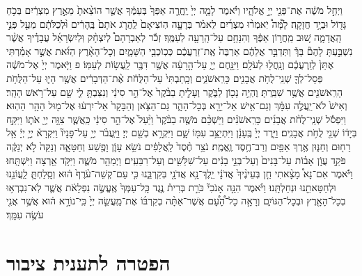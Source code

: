 \documentclass[twoside, openany, parskip=half, 11pt]{book}
\begin{document}
\begin{footnotesize}
\begin{multicols}{2}
וַיְחַ֣ל מֹשֶׁ֔ה אֶת־פְּנֵ֖י יְיָ֣ אֱלֹהָ֑יו וַיֹּ֗אמֶר לָמָ֤ה יְיָ֙ יֶֽחֱרֶ֤ה אַפְּךָ֙ בְּעַמֶּ֔ךָ אֲשֶׁ֤ר הוֹצֵ֨אתָ֙ מֵאֶ֣רֶץ מִצְרַ֔יִם בְּכֹ֥חַ גָּד֖וֹל וּבְיָ֥ד חֲזָקָֽה׃ לָ֩מָּה֩ יֹֽאמְר֨וּ מִצְרַ֜יִם לֵאמֹ֗ר בְּרָעָ֤ה הֽוֹצִיאָם֙ לַֽהֲרֹ֤ג אֹתָם֙ בֶּֽהָרִ֔ים וּ֨לְכַלֹּתָ֔ם מֵעַ֖ל פְּנֵ֣י הָֽאֲדָמָ֑ה שׁ֚וּב מֵֽחֲר֣וֹן אַפֶּ֔ךָ וְהִנָּחֵ֥ם עַל־הָֽרָעָ֖ה לְעַמֶּֽךָ׃ זְכֹ֡ר לְאַבְרָהָם֩ לְיִצְחָ֨ק וּֽלְיִשְׂרָאֵ֜ל עֲבָדֶ֗יךָ אֲשֶׁ֨ר נִשְׁבַּ֣עְתָּ לָהֶם֘ בָּךְ֒ וַתְּדַבֵּ֣ר אֲלֵהֶ֔ם אַרְבֶּה֙ אֶֽת־זַרְעֲכֶ֔ם כְּכֽוֹכְבֵ֖י הַשָּׁמָ֑יִם וְכָל־הָאָ֨רֶץ הַזֹּ֜את אֲשֶׁ֣ר אָמַ֗רְתִּי אֶתֵּן֙ לְזַֽרְעֲכֶ֔ם וְנָֽחֲל֖וּ לְעֹלָֽם׃ וַיִּנָּ֖חֶם יְיָ֑ עַל־הָ֣רָעָ֔ה אֲשֶׁ֥ר דִּבֶּ֖ר לַֽעֲשׂ֥וֹת לְעַמּֽוֹ׃ פ
 וַיֹּ֤אמֶר יְיָ֙ אֶל־מֹשֶׁ֔ה פְּסָל־לְךָ֛ שְׁנֵֽי־לֻחֹ֥ת אֲבָנִ֖ים כָּרִֽאשֹׁנִ֑ים וְכָֽתַבְתִּי֙ עַל־הַלֻּחֹ֔ת אֶ֨ת־הַדְּבָרִ֔ים אֲשֶׁ֥ר הָי֛וּ עַל־הַלֻּחֹ֥ת הָרִֽאשֹׁנִ֖ים אֲשֶׁ֥ר שִׁבַּֽרְתָּ׃ וֶהְיֵ֥ה נָכ֖וֹן לַבֹּ֑קֶר וְעָלִ֤יתָ בַבֹּ֨קֶר֙ אֶל־הַ֣ר סִינַ֔י וְנִצַּבְתָּ֥ לִ֛י שָׁ֖ם עַל־רֹ֥אשׁ הָהָֽר׃ וְאִישׁ֙ לֹא־יַֽעֲלֶ֣ה עִמָּ֔ךְ וְגַם־אִ֥ישׁ אַל־יֵרָ֖א בְּכָל־הָהָ֑ר גַּם־הַצֹּ֤אן וְהַבָּקָר֙ אַל־יִרְע֔וּ אֶל־מ֖וּל הָהָ֥ר הַהֽוּא׃ 
 וַיִּפְסֹ֡ל שְׁנֵֽי־לֻחֹ֨ת אֲבָנִ֜ים כָּרִֽאשֹׁנִ֗ים וַיַּשְׁכֵּ֨ם מֹשֶׁ֤ה בַבֹּ֨קֶר֙ וַיַּ֨עַל֙ אֶל־הַ֣ר סִינַ֔י כַּֽאֲשֶׁ֛ר צִוָּ֥ה יְיָ֖ אֹת֑וֹ וַיִּקַּ֣ח בְּיָד֔וֹ שְׁנֵ֖י לֻחֹ֥ת אֲבָנִֽים׃ וַיֵּ֤רֶד יְיָ֙ בֶּֽעָנָ֔ן וַיִּתְיַצֵּ֥ב עִמּ֖וֹ שָׁ֑ם וַיִּקְרָ֥א בְשֵׁ֖ם יְיָ׃ וַיַּֽעֲבֹ֨ר יְיָ֥ עַל־פָּנָיו֘ וַיִּקְרָא֒ יְיָ֣ יְיָ֔ אֵ֥ל רַח֖וּם וְחַנּ֑וּן אֶ֥רֶךְ אַפַּ֖יִם וְרַב־חֶ֥סֶד וֶֽאֱמֶֽת׃ נֹצֵ֥ר חֶ֨סֶד֙ לָֽאֲלָפִ֔ים נֹשֵׂ֥א עָוֹ֛ן וָפֶ֖שַׁע וְחַטָּאָ֑ה וְנַקֵּה֙ לֹ֣א יְנַקֶּ֔ה פֹּקֵ֣ד עֲוֹ֣ן אָב֗וֹת עַל־בָּנִים֙ וְעַל־בְּנֵ֣י בָנִ֔ים עַל־שִׁלֵּשִׁ֖ים וְעַל־רִבֵּעִֽים׃ וַיְמַהֵ֖ר מֹשֶׁ֑ה וַיִּקֹּ֥ד אַ֖רְצָה וַיִּשְׁתָּֽחוּ׃ וַיֹּ֡אמֶר אִם־נָא֩ מָצָ֨אתִי חֵ֤ן בְּעֵינֶ֨יךָ֙ אֲדֹנָ֔י יֵֽלֶךְ־נָ֥א אֲדֹנָ֖י בְּקִרְבֵּ֑נוּ כִּ֤י עַם־קְשֵׁה־עֹ֨רֶף֙ ה֔וּא וְסָֽלַחְתָּ֛ לַֽעֲוֹנֵ֥נוּ וּלְחַטָּאתֵ֖נוּ וּנְחַלְתָּֽנוּ׃ וַיֹּ֗אמֶר הִנֵּ֣ה אָנֹכִי֘ כֹּרֵ֣ת בְּרִית֒ נֶ֤גֶד כָּֽל־עַמְּךָ֙ אֶֽעֱשֶׂ֣ה נִפְלָאֹ֔ת אֲשֶׁ֛ר לֹֽא־נִבְרְא֥וּ בְכָל־הָאָ֖רֶץ וּבְכָל־הַגּוֹיִ֑ם וְרָאָ֣ה כָל־הָ֠עָ֠ם אֲשֶׁר־אַתָּ֨ה בְקִרְבּ֜וֹ אֶת־מַֽעֲשֵׂ֤ה יְיָ֙ כִּֽי־נוֹרָ֣א ה֔וּא אֲשֶׁ֥ר אֲנִ֖י עֹשֶׂ֥ה עִמָּֽךְ׃
 
\end{multicols} 
 
\section*{הפטרה לתענית ציבור}


\end{footnotesize}
\end{document}
